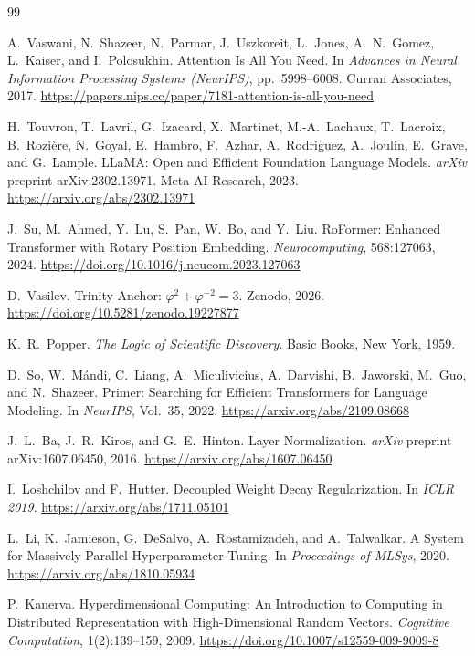 
\begin{thebibliography}{99}

  A.~Vaswani, N.~Shazeer, N.~Parmar, J.~Uszkoreit, L.~Jones, A.~N.~Gomez,
  L.~Kaiser, and I.~Polosukhin.
  Attention Is All You Need.
  In \textit{Advances in Neural Information Processing Systems (NeurIPS)},
  pp.~5998--6008. Curran Associates, 2017.
  \url{https://papers.nips.cc/paper/7181-attention-is-all-you-need}

  H.~Touvron, T.~Lavril, G.~Izacard, X.~Martinet, M.-A.~Lachaux,
  T.~Lacroix, B.~Rozi\`{e}re, N.~Goyal, E.~Hambro, F.~Azhar, A.~Rodriguez,
  A.~Joulin, E.~Grave, and G.~Lample.
  LLaMA: Open and Efficient Foundation Language Models.
  \textit{arXiv} preprint arXiv:2302.13971. Meta AI Research, 2023.
  \url{https://arxiv.org/abs/2302.13971}

  J.~Su, M.~Ahmed, Y.~Lu, S.~Pan, W.~Bo, and Y.~Liu.
  RoFormer: Enhanced Transformer with Rotary Position Embedding.
  \textit{Neurocomputing}, 568:127063, 2024.
  \url{https://doi.org/10.1016/j.neucom.2023.127063}

  D.~Vasilev.
  Trinity Anchor: $\varphi^2 + \varphi^{-2} = 3$.
  Zenodo, 2026.
  \url{https://doi.org/10.5281/zenodo.19227877}

  K.~R.~Popper.
  \textit{The Logic of Scientific Discovery}.
  Basic Books, New York, 1959.

  D.~So, W.~M\'{a}ndi, C.~Liang, A.~Miculivicius, A.~Darvishi,
  B.~Jaworski, M.~Guo, and N.~Shazeer.
  Primer: Searching for Efficient Transformers for Language Modeling.
  In \textit{NeurIPS}, Vol.~35, 2022.
  \url{https://arxiv.org/abs/2109.08668}

  J.~L.~Ba, J.~R.~Kiros, and G.~E.~Hinton.
  Layer Normalization.
  \textit{arXiv} preprint arXiv:1607.06450, 2016.
  \url{https://arxiv.org/abs/1607.06450}

  I.~Loshchilov and F.~Hutter.
  Decoupled Weight Decay Regularization.
  In \textit{ICLR 2019}.
  \url{https://arxiv.org/abs/1711.05101}

  L.~Li, K.~Jamieson, G.~DeSalvo, A.~Rostamizadeh, and A.~Talwalkar.
  A System for Massively Parallel Hyperparameter Tuning.
  In \textit{Proceedings of MLSys}, 2020.
  \url{https://arxiv.org/abs/1810.05934}

  P.~Kanerva.
  Hyperdimensional Computing: An Introduction to Computing in Distributed
  Representation with High-Dimensional Random Vectors.
  \textit{Cognitive Computation}, 1(2):139--159, 2009.
  \url{https://doi.org/10.1007/s12559-009-9009-8}


\end{thebibliography}
